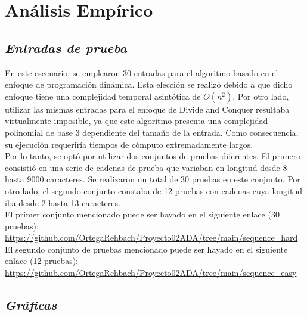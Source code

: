 \section{Análisis Empírico}

\subsection{\textit{\textbf{Entradas de prueba}}}

En este escenario, se emplearon 30 entradas para el algoritmo basado en el enfoque de programación dinámica. Esta elección se realizó debido a que dicho enfoque tiene una complejidad temporal asintótica de \(O(n^{2})\). Por otro lado, utilizar las mismas entradas para el enfoque de Divide and Conquer resultaba virtualmente imposible, ya que este algoritmo presenta una complejidad polinomial de base 3 dependiente del tamaño de la entrada. Como consecuencia, su ejecución requeriría tiempos de cómputo extremadamente largos.\\

Por lo tanto, se optó por utilizar dos conjuntos de pruebas diferentes. El primero consistió en una serie de cadenas de prueba que variaban en longitud desde 8 hasta 9000 caracteres. Se realizaron un total de 30 pruebas en este conjunto. Por otro lado, el segundo conjunto constaba de 12 pruebas con cadenas cuya longitud iba desde 2 hasta 13 caracteres.\\

El primer conjunto mencionado puede ser hayado en el siguiente enlace (30 pruebas): \url{https://github.com/OrtegaRehbach/Proyecto02ADA/tree/main/sequence_hard}\\

El segundo conjunto de pruebas mencionado puede ser hayado en el siguiente enlace (12 pruebas): \url{https://github.com/OrtegaRehbach/Proyecto02ADA/tree/main/sequence_easy}

\subsection{\textit{\textbf{Gráficas}}}

